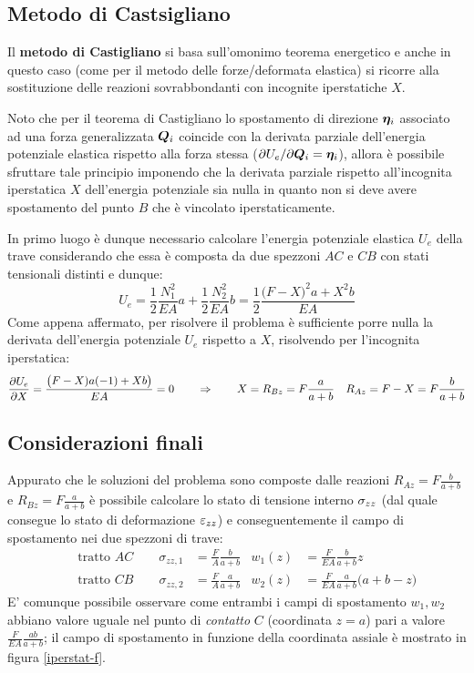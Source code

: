 	\subsection{Metodo di Castsigliano}
		\begin{concetto}
			Il \textbf{metodo di Castigliano} si basa sull'omonimo teorema energetico e anche in questo caso (come per il metodo delle forze/deformata elastica) si ricorre alla sostituzione delle reazioni sovrabbondanti con incognite iperstatiche $X$.
		\end{concetto}
		Noto che per il teorema di Castigliano lo spostamento di direzione $\boldsymbol{\eta}_i$ associato ad una forza generalizzata $\boldsymbol{Q}_i$ coincide con la derivata parziale dell'energia potenziale elastica rispetto alla forza stessa ($\partial U_e / \partial \boldsymbol{Q}_i = \boldsymbol{\eta}_i$), allora è possibile sfruttare tale principio imponendo che la derivata parziale rispetto all'incognita iperstatica $X$ dell'energia potenziale sia nulla in quanto non si deve avere spostamento del punto $B$ che è vincolato iperstaticamente.
		
		In primo luogo è dunque necessario calcolare l'energia potenziale elastica $U_e$ della trave considerando che essa è composta da due spezzoni $AC$ e $CB$ con stati tensionali distinti e dunque:
		\[  U_e = \frac 1 2 \frac{N_1^2}{EA}a + \frac 1 2 \frac{N_2^2}{EA}b = \frac 1 2 \frac{\big(F-X\big)^2 a + X^2 b}{EA}  \]
		Come appena affermato, per risolvere il problema è sufficiente porre nulla la derivata dell'energia potenziale $U_e$ rispetto a $X$, risolvendo per l'incognita iperstatica:
		\[ \frac{\partial U_e}{\partial X} = \frac{\big(F-X) a (-1) + Xb\big)}{EA} = 0 \qquad \Rightarrow \qquad X = R_{Bz} = F\frac a {a+b} \quad R_{Az} = F-X = F \frac b {a+b} \]
	
	\subsection*{Considerazioni finali}
		Appurato che le soluzioni del problema sono composte dalle reazioni $R_{Az} = F \frac b {a+b}$ e $R_{Bz} = F \frac a {a+b}$ è possibile calcolare lo stato di tensione interno $\sigma_{zz}$ (dal quale consegue lo stato di deformazione $\varepsilon_{zz}$) e conseguentemente il campo di spostamento nei due spezzoni di trave:
		\begin{align*}
			&& \textrm{tratto } AC \qquad \sigma_{zz,1} & = \frac F A \frac b{a+b} & w_1(z) &= \frac F{EA} \frac b {a+b} z \\
			&& \textrm{tratto } CB \qquad \sigma_{zz,2} & = \frac F A \frac a{a+b} & w_2(z) &= \frac F{EA} \frac a {a+b} \big(a+b-z\big) 
		\end{align*}
		E' comunque possibile osservare come entrambi i campi di spostamento $w_1,w_2$ abbiano valore uguale nel punto di \textit{contatto} $C$ (coordinata $z=a$) pari a valore $\frac F{EA} \frac{ab}{a+b}$; il campo di spostamento in funzione della coordinata assiale è mostrato in figura \ref{iperstat-f}.
		
